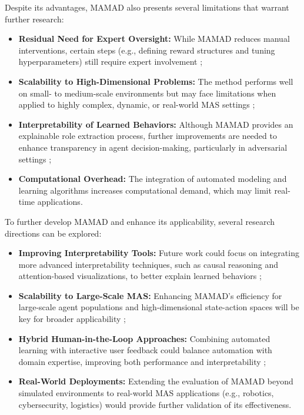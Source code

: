 \documentclass[pdflatex,sn-mathphys-num]{sn-jnl}%
\theoremstyle{thmstyleone}%
\theoremstyle{thmstyletwo}%
\theoremstyle{thmstylethree}%
\begin{document}
Despite its advantages, MAMAD also presents several limitations that warrant further research:
%
\begin{itemize}
    \item \textbf{Residual Need for Expert Oversight:} While MAMAD reduces manual interventions, certain steps (e.g., defining reward structures and tuning hyperparameters) still require expert involvement ;
    \item \textbf{Scalability to High-Dimensional Problems:} The method performs well on small- to medium-scale environments but may face limitations when applied to highly complex, dynamic, or real-world MAS settings ;
    \item \textbf{Interpretability of Learned Behaviors:} Although MAMAD provides an explainable role extraction process, further improvements are needed to enhance transparency in agent decision-making, particularly in adversarial settings ;
    \item \textbf{Computational Overhead:} The integration of automated modeling and learning algorithms increases computational demand, which may limit real-time applications.
\end{itemize}


To further develop MAMAD and enhance its applicability, several research directions can be explored:
%
\begin{itemize}
    \item \textbf{Improving Interpretability Tools:} Future work could focus on integrating more advanced interpretability techniques, such as causal reasoning and attention-based visualizations, to better explain learned behaviors ;
    \item \textbf{Scalability to Large-Scale MAS:} Enhancing MAMAD's efficiency for large-scale agent populations and high-dimensional state-action spaces will be key for broader applicability ;
    \item \textbf{Hybrid Human-in-the-Loop Approaches:} Combining automated learning with interactive user feedback could balance automation with domain expertise, improving both performance and interpretability ;
    \item \textbf{Real-World Deployments:} Extending the evaluation of MAMAD beyond simulated environments to real-world MAS applications (e.g., robotics, cybersecurity, logistics) would provide further validation of its effectiveness.
\end{itemize}



\end{document}
